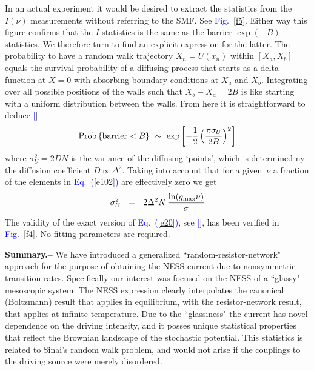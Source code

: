 \documentclass[aps,prl,floats,floatfix,twocolumn]{revtex4}
\newcommand{\mylabel}[1]{\label{#1}}
\newcommand{\eeq}{\end{eqnarray}}
\newcommand{\be}[1]{\begin{eqnarray}\ifthenelse{#1=-1}
{\nonumber}{\ifthenelse{#1=0}{}{\mylabel{e#1}}}}
\newcommand{\sect}[1]{{\bf #1.-- }}
\newcommand{\Eq}[1]{\textcolor{blue}{Eq.\!\!~(\ref{#1})}}
\newcommand{\Fig}[1]{\textcolor{blue}{Fig.}\!\!~\ref{#1}}
\renewcommand{\cite}[1]{\textcolor{blue}{[\onlinecite{#1}}]} %
\begin{document}
In an actual experiment it would be desired to 
extract the statistics from the $I(\nu)$ measurements 
without referring to the SMF. See \Fig{f5}.
Either way this figure confirms that the $I$ statistics
is the same as the barrier ${\exp(-B)}$ statistics. 
We therefore turn to find an explicit expression for the latter. 
%
%
The probability to have a random walk trajectory $X_n=U(x_n)$ within $[X_a,X_b]$ 
equals the survival probability of a diffusing process  
that starts as a delta function at ${X=0}$ 
with absorbing boundary conditions at $X_a$ and $X_b$.   
Integrating over all possible positions of the walls 
such that ${X_b-X_a=2B}$ is like starting with a 
uniform distribution between the walls. From here 
it is straightforward to deduce \cite{SM}
%
\be{20}
\text{Prob}\left\{\text{barrier}<B\right\} \ \sim \ \exp\left[-\frac{1}{2} \left(\frac{\pi \sigma_U}{2B}\right)^2\right] 
\eeq
%
where $\sigma_U^2 = 2D N$ is the variance of the diffusing `points', 
which is determined ny the diffusion coefficient $D\propto \Delta^2$.
Taking into account that for a given~$\nu$ a fraction of the elements
in \Eq{e102} are effectively zero we get 
%
\be{211}
\sigma_U^2 \ \ = \ \ 2 \Delta^2 N  \, \frac{\ln(g_{\text{max}}\nu)}{\sigma}
\eeq  
%  
The validity of the exact version of \Eq{e20}, see \cite{SM}, 
has been verified in \Fig{f4}. No fitting parameters are required. 


\sect{Summary}
%
%
We have introduced a generalized ``random-resistor-network"
approach for the purpose of obtaining the NESS current
due to nonsymmetric transition rates. Specifically our 
interest was focused on the NESS of a ``glassy" mesoscopic system. 
The NESS expression clearly interpolates the canonical (Boltzmann) result 
that applies in equilibrium, with the resistor-network result, 
that applies at infinite temperature. 
Due to the ``glassiness" the current has novel dependence 
on the driving intensity, and it posses unique statistical properties 
that reflect the Brownian landscape of the stochastic potential.
This statistics is related to Sinai's random walk problem, 
and would not arise if the couplings to the driving source 
were merely disordered.


\clearpage
\end{document}

